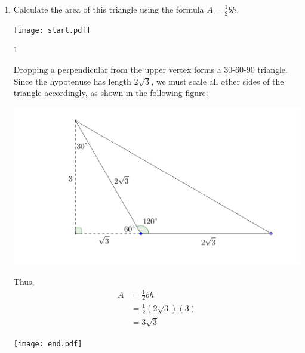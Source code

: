 \documentclass[12pt]{article}
\begin{document}
\begin{enumerate}
\begin{enumerate}
{\bf Heron's Formula:} The area of a triangle with sides of length $a$, $b$, and $c$ is $A=\sqrt{s(s-a)(s-b)(s-c)}$ where $s=\frac{a+b+c}{2}$

\texttt{[image: start.pdf]}
{{1\linewidth}{Using the Law of Cosines, the missing side of the triangle has length 6.  So, it follows that $a=2\sqrt{3}$, $b=2\sqrt{3}$, $c=6$, and $s=2\sqrt{3}+3$.  Appealing to Heron's Formula gives:
\begin{align*}
A&=\sqrt{s(s-a)(s-b)(s-c)}\\
&=\sqrt{\left(2\sqrt{3}+3\right)\left(2\sqrt{3}+3-2\sqrt{3}\right)\left(2\sqrt{3}+3-2\sqrt{3}\right)\left(2\sqrt{3}+3-6\right)}\\
&=\sqrt{\left(2\sqrt{3}+3\right)(3)(3)\left(2\sqrt{3}-3\right)}\\
&=3\sqrt{\left(2\sqrt{3}+3\right)\left(2\sqrt{3}-3\right)}\\
&=3\sqrt{3}
\end{align*}
}}
\texttt{[image: end.pdf]}


\item Calculate the area of this triangle using the formula $A=\frac{1}{2}bh$.

\texttt{[image: start.pdf]}
{{1\linewidth}{Dropping a perpendicular from the upper vertex forms a 30-60-90 triangle.  Since the hypotenuse has length $2\sqrt{3}$, we must scale all other sides of the triangle accordingly, as shown in the following figure:
\begin{center}
\includegraphics[scale=0.15]{heron1.pdf}
\end{center}
Thus,
\begin{align*}
A&=\frac{1}{2}bh\\
&=\frac{1}{2}\left(2\sqrt{3}\right)(3)\\
&=3\sqrt{3}
\end{align*}
}}
\texttt{[image: end.pdf]}


\end{enumerate}

\end{enumerate}
\end{document}
